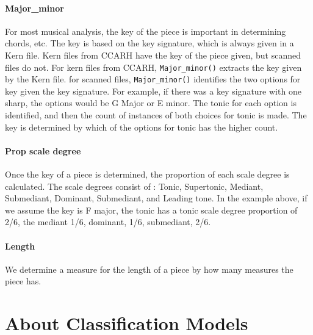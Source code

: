 \documentclass[12pt,twoside]{reedthesis}
\theoremstyle{definition}
\theoremstyle{definition}
\theoremstyle{definition}
\theoremstyle{remark}
\begin{document}
\subsubsection{Major\_minor}\label{major_minor}

For most musical analysis, the key of the piece is important in
determining chords, etc. The key is based on the key signature, which is
always given in a Kern file. Kern files from CCARH have the key of the
piece given, but scanned files do not. For kern files from CCARH,
\texttt{Major\_minor()} extracts the key given by the Kern file. for
scanned files, \texttt{Major\_minor()} identifies the two options for
key given the key signature. For example, if there was a key signature
with one sharp, the options would be G Major or E minor. The tonic for
each option is identified, and then the count of instances of both
choices for tonic is made. The key is determined by which of the options
for tonic has the higher count.

\subsubsection{Prop scale degree}\label{prop-scale-degree}

Once the key of a piece is determined, the proportion of each scale
degree is calculated. The scale degrees consist of : Tonic, Supertonic,
Mediant, Submediant, Dominant, Submediant, and Leading tone. In the
example above, if we assume the key is F major, the tonic has a tonic
scale degree proportion of 2/6, the mediant 1/6, dominant, 1/6,
submediant, 2/6.

\subsubsection{Length}\label{length}

We determine a measure for the length of a piece by how many measures
the piece has.

\chapter{About Classification Models}\label{about-classification-models}
\end{document}
